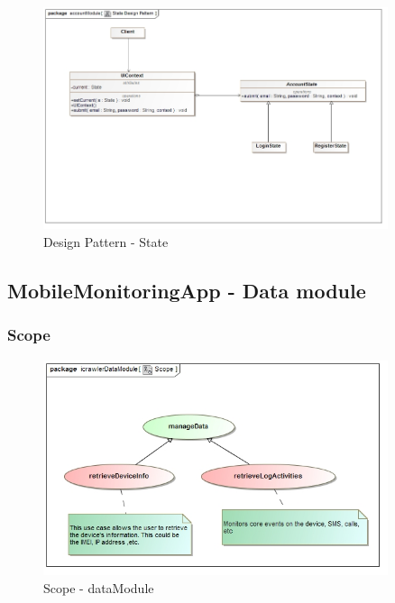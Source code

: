 \documentclass[hidelinks, 12pt, oneside]{article}
\begin{document}
		\begin{figure}[!htbp]
    		\centering
    		\includegraphics[width=0.9\textwidth]{img/design_patterns/AccountModule_StateDesignPattern.jpg}
    		\caption{Design Pattern - State}
    		\label{fig:DesignPat_state}
		\end{figure}
		\newpage
		
	\subsection{MobileMonitoringApp - Data module}
	\subsubsection{Scope}
	
		\begin{figure}[!htbp]
    		\centering
    		\includegraphics[width=0.9\textwidth]{img/scopeData.jpg}
    		\caption{Scope - dataModule}
    		\label{fig:Scope_dataModule}
		\end{figure}	
		
\end{document}
